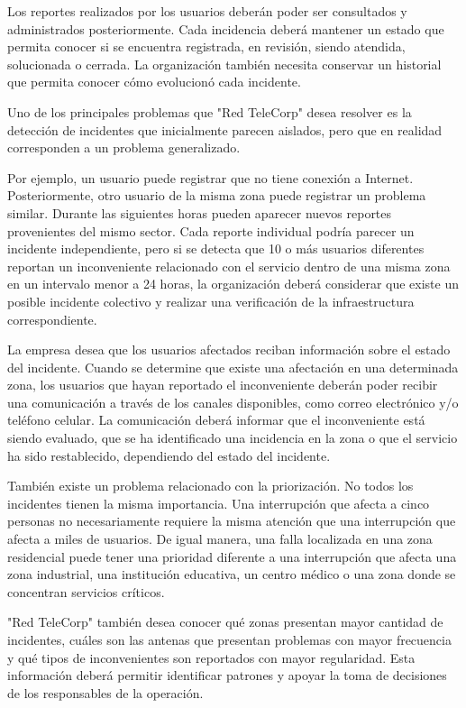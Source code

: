 Los reportes realizados por los usuarios deberán poder ser consultados y administrados posteriormente. Cada incidencia deberá mantener un estado que permita conocer si se encuentra registrada, en revisión, siendo atendida, solucionada o cerrada. La organización también necesita conservar un historial que permita conocer cómo evolucionó cada incidente.

Uno de los principales problemas que "Red TeleCorp" desea resolver es la detección de incidentes que inicialmente parecen aislados, pero que en realidad corresponden a un problema generalizado.

Por ejemplo, un usuario puede registrar que no tiene conexión a Internet. Posteriormente, otro usuario de la misma zona puede registrar un problema similar. Durante las siguientes horas pueden aparecer nuevos reportes provenientes del mismo sector. Cada reporte individual podría parecer un incidente independiente, pero si se detecta que 10 o más usuarios diferentes reportan un inconveniente relacionado con el servicio dentro de una misma zona en un intervalo menor a 24 horas, la organización deberá considerar que existe un posible incidente colectivo y realizar una verificación de la infraestructura correspondiente.

La empresa desea que los usuarios afectados reciban información sobre el estado del incidente. Cuando se determine que existe una afectación en una determinada zona, los usuarios que hayan reportado el inconveniente deberán poder recibir una comunicación a través de los canales disponibles, como correo electrónico y/o teléfono celular. La comunicación deberá informar que el inconveniente está siendo evaluado, que se ha identificado una incidencia en la zona o que el servicio ha sido restablecido, dependiendo del estado del incidente.

También existe un problema relacionado con la priorización. No todos los incidentes tienen la misma importancia. Una interrupción que afecta a cinco personas no necesariamente requiere la misma atención que una interrupción que afecta a miles de usuarios. De igual manera, una falla localizada en una zona residencial puede tener una prioridad diferente a una interrupción que afecta una zona industrial, una institución educativa, un centro médico o una zona donde se concentran servicios críticos.

"Red TeleCorp" también desea conocer qué zonas presentan mayor cantidad de incidentes, cuáles son las antenas que presentan problemas con mayor frecuencia y qué tipos de inconvenientes son reportados con mayor regularidad. Esta información deberá permitir identificar patrones y apoyar la toma de decisiones de los responsables de la operación.

